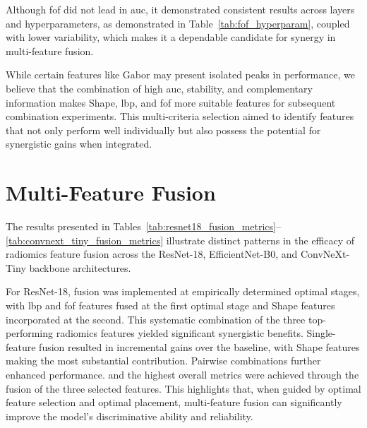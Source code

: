 Although \ac{fof} did not lead in \ac{auc}, it demonstrated consistent results across layers and hyperparameters, as demonstrated in Table~\ref{tab:fof_hyperparam}, coupled with lower variability, which makes it a dependable candidate for synergy in multi-feature fusion.

While certain features like Gabor may present isolated peaks in performance, we believe that the combination of high \ac{auc}, stability, and complementary information makes Shape, \ac{lbp}, and \ac{fof} more suitable features for subsequent combination experiments.
This multi-criteria selection aimed to identify features that not only perform well individually but also possess the potential for synergistic gains when integrated.


\section{Multi-Feature Fusion}

The results presented in Tables~\ref{tab:resnet18_fusion_metrics}--\ref{tab:convnext_tiny_fusion_metrics} illustrate distinct patterns in the efficacy of radiomics feature fusion across the ResNet-18, EfficientNet-B0, and ConvNeXt-Tiny backbone architectures.

For ResNet-18, fusion was implemented at empirically determined optimal stages, with \ac{lbp} and \ac{fof} features fused at the first optimal stage and Shape features incorporated at the second. This systematic combination of the three top-performing radiomics features yielded significant synergistic benefits. Single-feature fusion resulted in incremental gains over the baseline, with Shape features making the most substantial contribution. Pairwise combinations further enhanced performance. and the highest overall metrics were achieved through the fusion of the three selected features. This highlights that, when guided by optimal feature selection and optimal placement, multi-feature fusion can significantly improve the model's discriminative ability and reliability.

